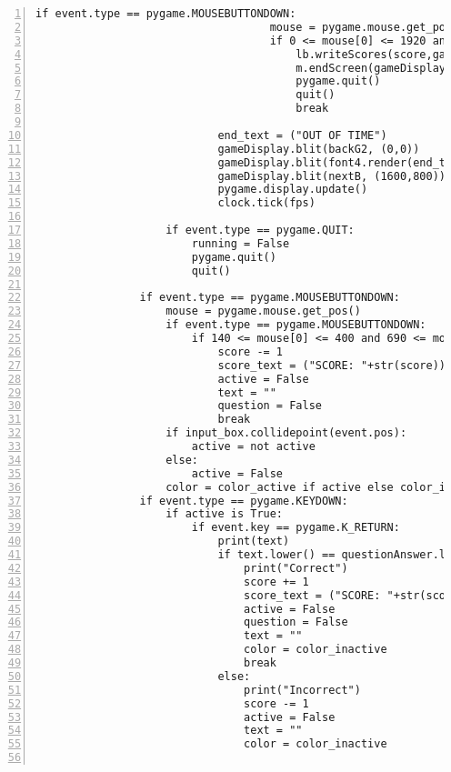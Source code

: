 \documentclass[12pt]{report}
\begin{document}
\begin{Verbatim}[numbers=left, frame=single]
                                if event.type == pygame.MOUSEBUTTONDOWN:
                                    mouse = pygame.mouse.get_pos()
                                    if 0 <= mouse[0] <= 1920 and 0 <= mouse[1] <= 1080:
                                        lb.writeScores(score,gameDisplay,fps,username)
                                        m.endScreen(gameDisplay,fps)
                                        pygame.quit()
                                        quit()
                                        break
                                                                
                            end_text = ("OUT OF TIME")
                            gameDisplay.blit(backG2, (0,0))
                            gameDisplay.blit(font4.render(end_text, True, (255, 255, 255)), (50, 50))
                            gameDisplay.blit(nextB, (1600,800))
                            pygame.display.update()
                            clock.tick(fps)

                    if event.type == pygame.QUIT:                                                                           
                        running = False
                        pygame.quit()
                        quit()

                if event.type == pygame.MOUSEBUTTONDOWN:
                    mouse = pygame.mouse.get_pos()
                    if event.type == pygame.MOUSEBUTTONDOWN:
                        if 140 <= mouse[0] <= 400 and 690 <= mouse[1] <= 790:
                            score -= 1
                            score_text = ("SCORE: "+str(score))
                            active = False
                            text = ""
                            question = False
                            break
                    if input_box.collidepoint(event.pos):
                        active = not active
                    else:
                        active = False
                    color = color_active if active else color_inactive
                if event.type == pygame.KEYDOWN:
                    if active is True:
                        if event.key == pygame.K_RETURN:
                            print(text)
                            if text.lower() == questionAnswer.lower():
                                print("Correct")
                                score += 1
                                score_text = ("SCORE: "+str(score))
                                active = False
                                question = False
                                text = ""
                                color = color_inactive
                                break
                            else:
                                print("Incorrect")
                                score -= 1
                                active = False
                                text = ""
                                color = color_inactive
                                                            

\end{Verbatim}
\end{document}
